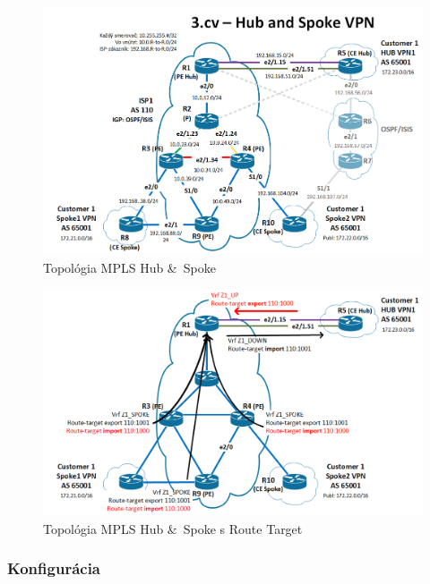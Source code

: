 \documentclass[12pt,twoside,a4paper]{report}
\begin{document}
\begin{figure}[!htbp]
\centering
\includegraphics[width=14cm,keepaspectratio]{mpls_hub_spoke_topo}
\caption{Topológia MPLS Hub \& Spoke}
\label{fig:mpls_hub_spoke_topo}
\end{figure}

\begin{figure}[!htbp]
\centering
\includegraphics[width=14cm,keepaspectratio]{mpls_hub_spoke_route_target_topo}
\caption{Topológia MPLS Hub \& Spoke s Route Target}
\label{fig:mpls_hub_spoke_route_target_topo}
\end{figure}

\subsubsection{Konfigurácia}
\paragraph{}
\end{document}
